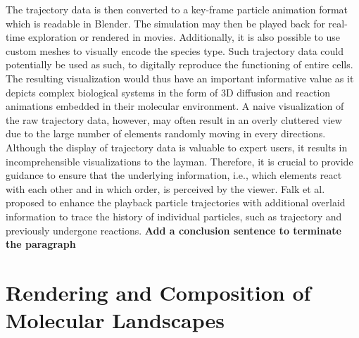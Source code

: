 The trajectory data is then converted to a key-frame particle animation format which is readable in Blender.
The simulation may then be played back for real-time exploration or rendered in movies.
Additionally, it is also possible to use custom meshes to visually encode the species type.
Such trajectory data could potentially be used as such, to digitally reproduce the functioning of entire cells.
The resulting visualization would thus have an important informative value as it depicts complex biological systems in the form of 3D diffusion and reaction animations embedded in their molecular environment.
A naive visualization of the raw trajectory data, however, may often result in an overly cluttered view due to the large number of elements randomly moving in every directions.
Although the display of trajectory data is valuable to expert users, it results in incomprehensible visualizations to the layman.
Therefore, it is crucial to provide guidance to ensure that the underlying information, i.e., which elements react with each other and in which order, is perceived by the viewer.
Falk et al.~\cite{falk2009visualization} proposed to enhance the playback particle trajectories with additional overlaid information to trace the history of individual particles, such as trajectory and previously undergone reactions.
\textbf{Add a conclusion sentence to terminate the paragraph}

\section{Rendering and Composition of Molecular Landscapes}

